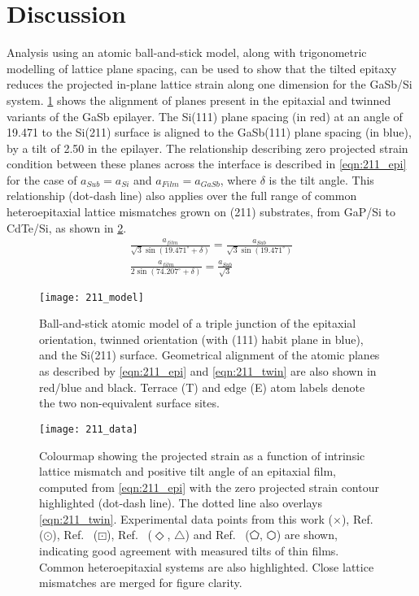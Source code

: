 \section{Discussion}
Analysis using an atomic ball-and-stick model, along with trigonometric modelling of lattice plane spacing, can be used to show that the tilted epitaxy reduces the projected in-plane lattice strain along one dimension for the GaSb/Si system.
\cref{fig:211_model} shows the alignment of planes present in the epitaxial and twinned variants of the GaSb epilayer.
The Si(111) plane spacing (in red) at an angle of 19.471\degree{} to the Si(211) surface is aligned to the GaSb(111) plane spacing (in blue), by a tilt of 2.50\degree{} in the epilayer.
The relationship describing zero projected strain condition between these planes across the interface is described in \cref{eqn:211_epi} for the case of \(a_{Sub} = a_{Si}\) and \(a_{Film} = a_{GaSb}\), where \(\delta\) is the tilt angle.
This relationship (dot-dash line) also applies over the full range of common heteroepitaxial lattice mismatches grown on (211) substrates, from GaP/Si to CdTe/Si, as shown in \cref{fig:211_data}.
\begin{gather}
 \frac{a_{film}}{\sqrt{3} \sin(19.471^\circ + \delta)} = \frac{a_{Sub}}{\sqrt{3}\sin(19.471^\circ)} \label{eqn:211_epi}\\
 \frac{ a_{film}}{2\sin(74.207^\circ + \delta)} = \frac{a_{Sub}}{\sqrt{3}} \label{eqn:211_twin}
\end{gather}

\begin{figure}
 \centering \texttt{[image: 211\_model]}
 \caption[Atomic model of tilted thin film on 211 silicon]{\label{fig:211_model}Ball-and-stick atomic model of a triple junction of the epitaxial orientation, twinned orientation (with (111) habit plane in blue), and the Si(211) surface.
  Geometrical alignment of the atomic planes as described by \cref{eqn:211_epi} and \cref{eqn:211_twin} are also shown in red/blue and black.
  Terrace (T) and edge (E) atom labels denote the two non-equivalent surface sites.}
\end{figure}

\begin{figure}
 \centering \texttt{[image: 211\_data]}
 \caption[Colourmap of tilt and intrinsic lattice mismatch of thin films on 211 substrates]{\label{fig:211_data}Colourmap showing the projected strain as a function of intrinsic lattice mismatch and positive tilt angle of an epitaxial film, computed from \cref{eqn:211_epi} with the zero projected strain contour highlighted (dot-dash line).
  The dotted line also overlays \cref{eqn:211_twin}.
  Experimental data points from this work (\(\times\)), Ref.~ (\(\odot\)), Ref.~ (\(\boxdot\)), Ref.~ (\(\Diamond\), \(\bigtriangleup\)) and Ref.~ (\(\pentagon\), \(\varhexagon\)) are shown, indicating good agreement with measured tilts of thin films.
  Common heteroepitaxial systems are also highlighted.
  Close lattice mismatches are merged for figure clarity.}
\end{figure}

